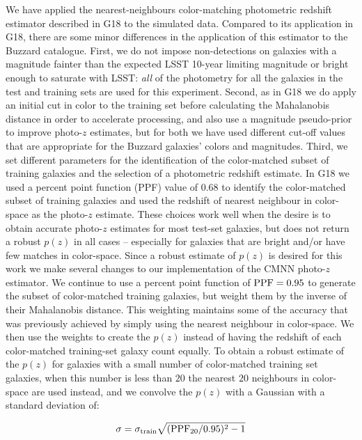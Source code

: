 We have applied the nearest-neighbours color-matching photometric redshift estimator described in G18 to the simulated data. Compared to its application in G18, there are some minor differences in the application of this estimator to the Buzzard catalogue. First, we do not impose non-detections on galaxies with a magnitude fainter than the expected LSST 10-year limiting magnitude or bright enough to saturate with LSST: {\it all} of the photometry for all the galaxies in the test and training sets are used for this experiment. Second, as in G18 we do apply an initial cut in color to the training set before calculating the Mahalanobis distance in order to accelerate processing, and also use a magnitude pseudo-prior to improve photo-$z$ estimates, but for both we have used different cut-off values that are appropriate for the Buzzard galaxies' colors and magnitudes. Third, we set different parameters for the identification of the color-matched subset of training galaxies and the selection of a photometric redshift estimate. In G18 we used a percent point function (PPF) value of 0.68 to identify the color-matched subset of training galaxies and used the redshift of nearest neighbour in color-space as the photo-$z$ estimate. These choices work well when the desire is to obtain accurate photo-$z$ estimates for most test-set galaxies, but does not return a robust $p(z)$ in all cases -- especially for galaxies that are bright and/or have few matches in color-space. Since a robust estimate of $p(z)$ is desired for this work we make several changes to our implementation of the \textsc{CMNN} photo-$z$ estimator. We continue to use a percent point function of ${\rm PPF} = 0.95$ to generate the subset of color-matched training galaxies, but weight them by the inverse of their Mahalanobis distance. This weighting maintains some of the accuracy that was previously achieved by simply using the nearest neighbour in color-space. We then use the weights to create the $p(z)$ instead of having the redshift of each color-matched training-set galaxy count equally. To obtain a robust estimate of the $p(z)$ for galaxies with a small number of color-matched training set galaxies, when this number is less than $20$ the nearest $20$ neighbours in color-space are used instead, and we convolve the $p(z)$ with a Gaussian with a standard deviation of:

\begin{equation}
\sigma = \sigma_{\rm train} \sqrt{({\rm PPF}_{20}/0.95)^2 -1}
\end{equation}

